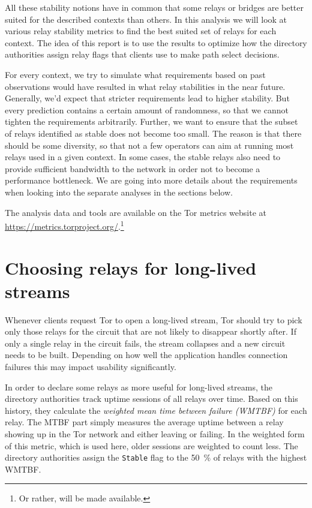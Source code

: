 \documentclass{article}
\begin{document}
All these stability notions have in common that some relays or bridges are
better suited for the described contexts than others.
In this analysis we will look at various relay stability metrics to find
the best suited set of relays for each context.
The idea of this report is to use the results to optimize how the
directory authorities assign relay flags that clients use to make path
select decisions.

For every context, we try to simulate what requirements based on past
observations would have resulted in what relay stabilities in the near
future.
Generally, we'd expect that stricter requirements lead to higher
stability.
But every prediction contains a certain amount of randomness, so that we
cannot tighten the requirements arbitrarily.
Further, we want to ensure that the subset of relays identified as stable
does not become too small.
The reason is that there should be some diversity, so that not a few
operators can aim at running most relays used in a given context.
In some cases, the stable relays also need to provide sufficient bandwidth
to the network in order not to become a performance bottleneck.
We are going into more details about the requirements when looking into
the separate analyses in the sections below.

The analysis data and tools are available on the Tor metrics website at
\url{https://metrics.torproject.org/}.\footnote{Or rather, will be made
available.}

\section{Choosing relays for long-lived streams}
\label{sec:mtbf-sim}

Whenever clients request Tor to open a long-lived stream, Tor should try
to pick only those relays for the circuit that are not likely to disappear
shortly after.
If only a single relay in the circuit fails, the stream collapses and a
new circuit needs to be built.
Depending on how well the application handles connection failures this may
impact usability significantly.

In order to declare some relays as more useful for long-lived streams, the
directory authorities track uptime sessions of all relays over time.
Based on this history, they calculate the \emph{weighted mean time between
failure (WMTBF)} for each relay.
The MTBF part simply measures the average uptime between a relay showing
up in the Tor network and either leaving or failing.
In the weighted form of this metric, which is used here, older sessions
are weighted to count less.
The directory authorities assign the \texttt{Stable} flag to the 50~\% of
relays with the highest WMTBF.
\end{document}
